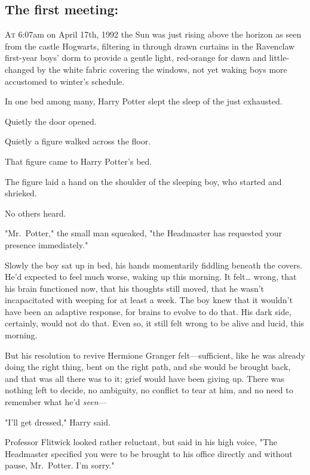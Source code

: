 
\subsection{The first meeting:}

\lettrine{A}{t} 6:07am on April 17th, 1992 the Sun was just rising above the horizon as seen 
from the castle Hogwarts, filtering in through drawn curtains in the Ravenclaw 
first-year boys' dorm to provide a gentle light, red-orange for dawn and 
little-changed by the white fabric covering the windows, not yet waking boys 
more accustomed to winter's schedule.

In one bed among many, Harry Potter slept the sleep of the just exhausted.

Quietly the door opened.

Quietly a figure walked across the floor.

That figure came to Harry Potter's bed.

The figure laid a hand on the shoulder of the sleeping boy, who started and 
shrieked.

No others heard.

"Mr.~Potter," the small man squeaked, "the Headmaster has requested your 
presence immediately."

Slowly the boy sat up in bed, his hands momentarily fiddling beneath the 
covers. He'd expected to feel much worse, waking up this morning. It 
felt{\ldots} wrong, that his brain functioned now, that his thoughts still 
moved, that he wasn't incapacitated with weeping for at least a week. The boy 
knew that it wouldn't have been an adaptive response, for brains to evolve to 
do that. His dark side, certainly, would not do that. Even so, it still felt 
wrong to be alive and lucid, this morning.

But his resolution to revive Hermione Granger felt---sufficient, like he was 
already doing the right thing, bent on the right path, and she would be brought 
back, and that was all there was to it; grief would have been giving up. There 
was nothing left to decide, no ambiguity, no conflict to tear at him, and no 
need to remember what he'd \emph{seen}---

"I'll get dressed," Harry said.

Professor Flitwick looked rather reluctant, but said in his high voice, "The 
Headmaster specified you were to be brought to his office directly and without 
pause, Mr.~Potter. I'm sorry."

